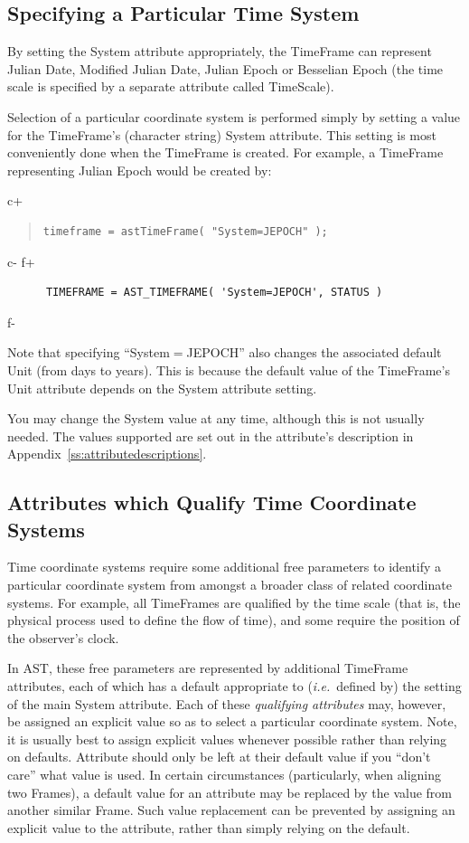 \documentclass[twoside,11pt]{article}
\newcommand{\appref}[1]{Appendix~\ref{#1}}
\newcommand{\appref}[1]{\ref{#1}}
\begin{document}
\subsection{Specifying a Particular Time System}
By setting the System attribute appropriately, the TimeFrame can represent 
Julian Date, Modified Julian Date, Julian Epoch or Besselian Epoch (the
time scale is specified by a separate attribute called TimeScale).

Selection of a particular coordinate system is performed simply by
setting a value for the TimeFrame's (character string) System
attribute. This setting is most conveniently done when the TimeFrame is
created. For example, a TimeFrame representing Julian Epoch would be created 
by:

c+
\begin{quote}
\small
\begin{verbatim}
timeframe = astTimeFrame( "System=JEPOCH" );
\end{verbatim}
\normalsize
\end{quote}
c-
f+
\small
\begin{verbatim}
      TIMEFRAME = AST_TIMEFRAME( 'System=JEPOCH', STATUS )
\end{verbatim}
\normalsize
f-

Note that specifying ``System$=$JEPOCH'' also changes the associated
default Unit (from days to years). This is because the default value
of the TimeFrame's Unit attribute depends on the System attribute setting.

You may change the System value at any time, although this is not
usually needed.  The values supported are set out in the attribute's
description in \appref{ss:attributedescriptions}.

\subsection{Attributes which Qualify Time Coordinate Systems}

Time coordinate systems require some additional free parameters to identify 
a particular coordinate system from amongst a broader class of related 
coordinate systems. For example, all TimeFrames are qualified by the time 
scale (that is, the physical process used to define the flow of time),
and some require the position of the observer's clock.

In AST, these free parameters are represented by additional TimeFrame
attributes, each of which has a default appropriate to ({\em{i.e.}}\ defined 
by) the setting of the main System attribute. Each of these {\em{qualifying 
attributes}} may, however, be assigned an explicit value so as to select a 
particular coordinate system. Note, it is usually best to assign explicit
values whenever possible rather than relying on defaults. Attribute
should only be left at their default value if you ``don't care'' what
value is used. In certain circumstances (particularly, when aligning two
Frames), a default value for an attribute may be replaced by the value
from another similar Frame. Such value replacement can be prevented by 
assigning an explicit value to the attribute, rather than simply relying on 
the default.
\end{document}
